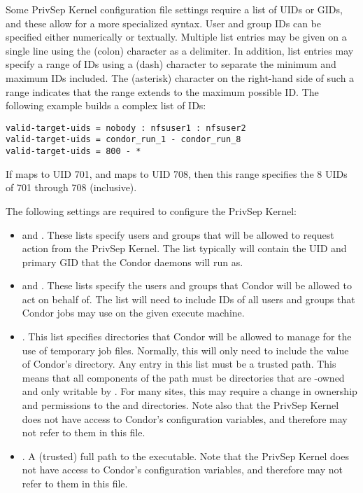 Some PrivSep Kernel configuration file settings require a list of UIDs or GIDs,
and these allow for a more specialized syntax.
User and group IDs can be specified either numerically or textually.
Multiple list entries may be given on a single
line using the \Code{:} (colon) character as a delimiter.
In addition, list entries
may specify a range of IDs using a \Code{-} (dash)
character to separate the minimum and maximum IDs included.
The \Code{*} (asterisk) character on the right-hand side of such a
range indicates that the range extends to the maximum possible ID. 
The following example builds a complex list of IDs:
\begin{verbatim}
valid-target-uids = nobody : nfsuser1 : nfsuser2
valid-target-uids = condor_run_1 - condor_run_8
valid-target-uids = 800 - *
\end{verbatim}

If  maps to UID 701, and
 maps to UID 708, 
then this range specifies the 8 UIDs of 701 through 708 (inclusive).

The following settings are required to configure the PrivSep Kernel:
\begin{itemize}

\item {} and . These lists
specify users and groups that will be allowed to request action from
the PrivSep Kernel. The list typically will contain the
UID and primary GID that the Condor daemons will run as.

\item {} and . These lists
specify the users and groups that Condor will be allowed to act on
behalf of. The list will need to include IDs of all users and groups
that Condor jobs may use on the given execute machine.

\item {}. This list specifies directories that
Condor will be allowed to manage for the use of temporary job
files. Normally, this will only need to include the value of Condor's
 directory. Any entry in this list must be a trusted
path. This means that all components of the path must be directories
that are -owned and only writable by . For
many sites, this may require a change in ownership and permissions
to the  and  directories. Note also
that the PrivSep Kernel does not have access to Condor's configuration
variables, and therefore may not refer to them in this file.

\item {}. A (trusted) full path to the
 executable.
Note that the PrivSep Kernel does not
have access to Condor's configuration variables,
and therefore may not refer to them in this file.

\end{itemize}

